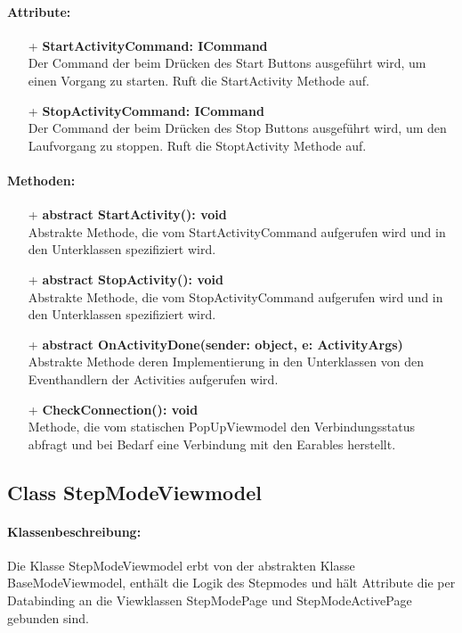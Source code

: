 \documentclass[a4paper,12pt]{article}
\begin{document}
\paragraph{Attribute:}
\begin{itemize}
	\item[+] \textbf{StartActivityCommand: ICommand} \\  Der Command der beim Drücken des Start Buttons ausgeführt wird, um einen Vorgang zu starten. Ruft die StartActivity Methode auf.
	\item[+] \textbf{StopActivityCommand: ICommand} \\ Der Command der beim Drücken des Stop Buttons ausgeführt wird, um den Laufvorgang zu stoppen. Ruft die StoptActivity Methode auf.
\end{itemize} 
\paragraph{Methoden:}
\begin{itemize}
	\item[+] \textbf{abstract StartActivity(): void} \\ Abstrakte Methode, die vom StartActivityCommand aufgerufen wird und in den Unterklassen spezifiziert wird.
	\item[+] \textbf{abstract StopActivity(): void} \\ Abstrakte Methode, die vom StopActivityCommand aufgerufen wird und in den Unterklassen spezifiziert wird.
	\item[+] \textbf{abstract OnActivityDone(sender: object, e: ActivityArgs)} \\ Abstrakte Methode deren Implementierung in den Unterklassen von den Eventhandlern der Activities aufgerufen wird.
	\item[+] \textbf{CheckConnection(): void} \\ Methode, die vom statischen PopUpViewmodel den Verbindungsstatus abfragt und bei Bedarf eine Verbindung mit den \Gls{Earables} herstellt.
\end{itemize}


\subsection{Class StepModeViewmodel}

\paragraph{Klassenbeschreibung:}
Die Klasse StepModeViewmodel erbt von der abstrakten Klasse BaseModeViewmodel, enthält die Logik des Stepmodes  und hält Attribute die per Databinding an die Viewklassen StepModePage und StepModeActivePage gebunden sind. 
\end{document}
